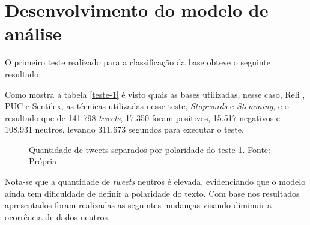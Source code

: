 \section{Desenvolvimento do modelo de análise}\label{sec:desenv-moda}
O primeiro teste realizado para a classificação da base obteve o seguinte resultado:
\begin{table}[]
	\caption{1º teste}
	\label{teste-1}
\end{table}

Como mostra a tabela \ref{teste-1} é visto quais as bases utilizadas, nesse caso, Reli , PUC e Sentilex, as técnicas utilizadas nesse teste, \textit{Stopwords} e \textit{Stemming}, e o resultado que de 141.798 \textit{tweets}, 17.350 foram positivos, 15.517 negativos e 108.931 neutros, levando 311,673 segundos para executar o teste.
\begin{figure}[!h]
	\centering{}
	\caption{Quantidade de tweets separados por polaridade do teste 1. Fonte: Própria}
	\label{teste-graf-1}
\end{figure}

Nota-se que a quantidade de \textit{tweets} neutros é elevada, evidenciando que o modelo ainda tem dificuldade de definir a polaridade do texto. Com base nos resultados apresentados foram realizadas as seguintes mudanças visando diminuir a ocorrência de dados neutros.
 
